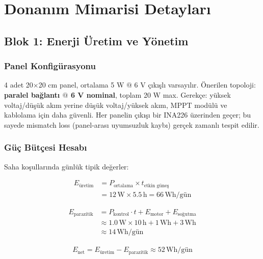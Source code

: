 \documentclass[11pt,a4paper]{article}
\begin{document}
\section{Donanım Mimarisi Detayları}

\subsection{Blok 1: Enerji Üretim ve Yönetim}

\subsubsection{Panel Konfigürasyonu}

4 adet 20$\times$20 cm panel, ortalama 5 W $@$ 6 V çıkışlı varsayılır. Önerilen topoloji: \textbf{paralel bağlantı $@$ 6 V nominal}, toplam 20 W max. Gerekçe: yüksek voltaj/düşük akım yerine düşük voltaj/yüksek akım, MPPT modülü ve kablolama için daha güvenli. Her panelin çıkışı bir INA226 üzerinden geçer; bu sayede mismatch loss (panel-arası uyumsuzluk kaybı) gerçek zamanlı tespit edilir.

\subsubsection{Güç Bütçesi Hesabı}

Saha koşullarında günlük tipik değerler:

\begin{align}
E_{\text{üretim}} &= P_{\text{ortalama}} \times t_{\text{etkin güneş}} \nonumber \\
                  &= 12\,\text{W} \times 5.5\,\text{h} = 66\,\text{Wh/gün}
\end{align}

\begin{align}
E_{\text{parazitik}} &= P_{\text{kontrol}} \cdot t + E_{\text{motor}} + E_{\text{soğutma}} \nonumber \\
                     &\approx 1.0\,\text{W} \times 10\,\text{h} + 1\,\text{Wh} + 3\,\text{Wh} \nonumber \\
                     &\approx 14\,\text{Wh/gün}
\end{align}

\begin{align}
E_{\text{net}} = E_{\text{üretim}} - E_{\text{parazitik}} \approx 52\,\text{Wh/gün}
\end{align}
\end{document}
